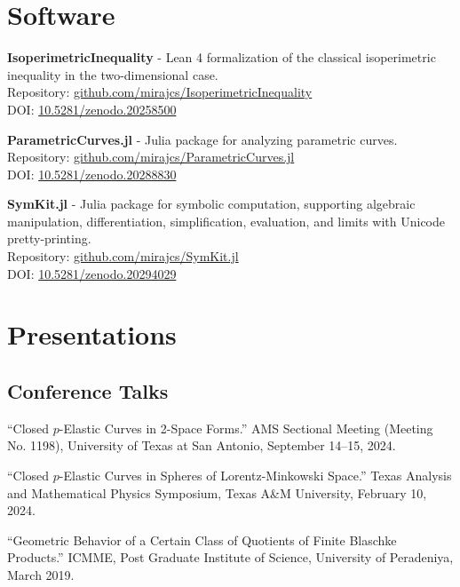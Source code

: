 \documentclass[11pt]{article}
\begin{document}
\section*{Software}

\begin{etaremune}
	\item \textbf{IsoperimetricInequality} - Lean 4 formalization of the classical isoperimetric inequality in the two-dimensional case.\\
	      Repository: \href{https://github.com/mirajcs/IsoperimetricInequality}{github.com/mirajcs/IsoperimetricInequality}\\
	      DOI: \href{https://doi.org/10.5281/zenodo.20258500}{10.5281/zenodo.20258500}
	\item \textbf{ParametricCurves.jl} - Julia package for analyzing parametric curves.\\
	      Repository: \href{https://github.com/mirajcs/ParametricCurves.jl}{github.com/mirajcs/ParametricCurves.jl}\\
	      DOI: \href{https://doi.org/10.5281/zenodo.20288830}{10.5281/zenodo.20288830}
	\item \textbf{SymKit.jl} - Julia package for symbolic computation, supporting algebraic manipulation, differentiation, simplification, evaluation, and limits with Unicode pretty-printing.\\
	      Repository: \href{https://github.com/mirajcs/SymKit.jl}{github.com/mirajcs/SymKit.jl}\\
	      DOI: \href{https://doi.org/10.5281/zenodo.20294029}{10.5281/zenodo.20294029}
\end{etaremune}

\section*{Presentations}

\subsection*{Conference Talks}
\begin{etaremune}
	\item ``Closed $p$-Elastic Curves in 2-Space Forms.'' AMS Sectional Meeting (Meeting No. 1198), University of Texas at San Antonio, September 14--15, 2024.
	\item ``Closed $p$-Elastic Curves in Spheres of Lorentz-Minkowski Space.'' Texas Analysis and Mathematical Physics Symposium, Texas A\&M University, February 10, 2024.
	\item ``Geometric Behavior of a Certain Class of Quotients of Finite Blaschke Products.'' ICMME, Post Graduate Institute of Science, University of Peradeniya, March 2019.
\end{etaremune}
\end{document}
